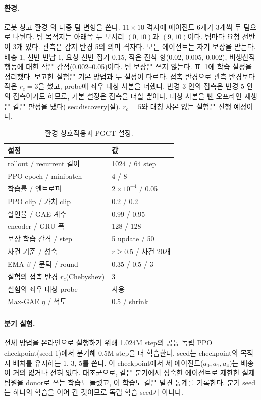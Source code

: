 \documentclass[10pt,twocolumn,letterpaper]{article}
\begin{document}
\paragraph{환경.} 로봇 창고 환경 \citep{benchmark}의 다중 팀 변형을 쓴다. $11\times10$ 격자에 에이전트 6개가 3개씩 두 팀으로 나뉜다. 팀 목적지는 아래쪽 두 모서리 $(0,10)$과 $(9,10)$이다. 팀마다 요청 선반이 3개 있다. 관측은 감지 반경 5의 의미 격자다. 모든 에이전트는 자기 보상을 받는다. 배송 1, 선반 반납 1, 요청 선반 집기 0.15, 작은 진척 항(0.02, 0.005, 0.002), 비생산적 행동에 대한 작은 감점(0.002--0.05)이다. 팀 보상은 쓰지 않는다. 표~\ref{tab:settings}에 학습 설정을 정리했다. 보고한 실험은 기본 방법과 두 설정이 다르다. 접촉 반경으로 관측 반경보다 작은 $r_c=3$을 썼고, probe에 좌우 대칭 사본을 더했다. 반경 3 안의 접촉은 반경 5 안의 접촉이기도 하므로, 기본 설정은 접촉을 더할 뿐이다. 대칭 사본을 뺀 오프라인 재생은 같은 판정을 냈다(\ref{sec:discovery}절). $r_c=5$와 대칭 사본 없는 실험은 진행 예정이다.

\begin{table}[t]\centering\small
\begin{tabular}{ll}\toprule
설정 & 값\\\midrule
rollout / recurrent 길이 & 1024 / 64 step\\
PPO epoch / minibatch & 4 / 8\\
학습률 / 엔트로피 & $2\times10^{-4}$ / 0.05\\
PPO clip / 가치 clip & 0.2 / 0.2\\
할인율 / GAE 계수 & 0.99 / 0.95\\
encoder / GRU 폭 & 128 / 128\\
보상 학습 간격 / step & 5 update / 50\\
사건 기준 / 성숙 & $r\ge0.5$ / 사건 20개\\
EMA $\beta$ / 문턱 / round & 0.35 / 0.5 / 3\\
실험의 접촉 반경 $r_c$(Chebyshev) & 3\\
실험의 좌우 대칭 probe & 사용\\
Max-GAE $\eta$ / 척도 & 0.5 / shrink\\\bottomrule
\end{tabular}
\caption{환경 상호작용과 PGCT 설정.}\label{tab:settings}
\end{table}

\paragraph{분기 실험.} 전체 방법을 온라인으로 실행하기 위해 1.024M step의 공통 독립 PPO checkpoint(seed 1)에서 분기해 0.5M step을 더 학습한다. seed는 checkpoint의 목적지 배치를 유지하는 1, 3, 5를 쓴다. 이 checkpoint에서 세 에이전트($a_0,a_1,a_4$)는 배송이 거의 없거나 전혀 없다. 대조군으로, 같은 분기에서 성숙한 에이전트로 제한한 실제 팀원을 donor로 쓰는 학습도 돌렸고, 이 학습도 같은 발견 통계를 기록한다. 분기 seed는 하나의 학습을 이어 간 것이므로 독립 학습 seed가 아니다.
\end{document}
